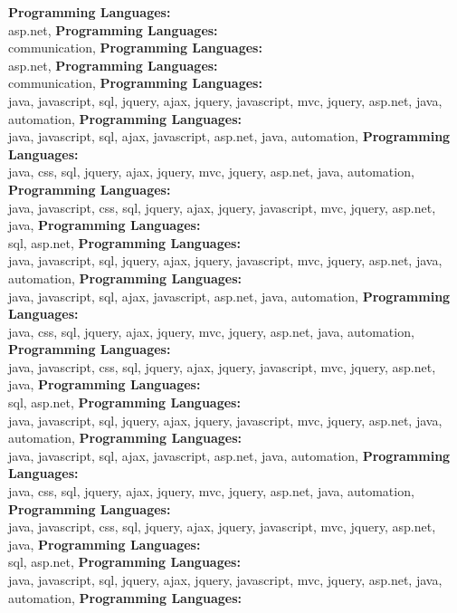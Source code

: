 \textbf{Programming Languages:} \\
asp.net, \textbf{Programming Languages:} \\
communication, \textbf{Programming Languages:} \\
asp.net, \textbf{Programming Languages:} \\
communication, \textbf{Programming Languages:} \\
java, javascript, sql, jquery, ajax,  jquery, javascript, mvc, jquery, asp.net, java, automation, \textbf{Programming Languages:} \\
java, javascript, sql, ajax, javascript, asp.net, java, automation, \textbf{Programming Languages:} \\
java, css, sql, jquery, ajax,  jquery, mvc, jquery, asp.net, java, automation, \textbf{Programming Languages:} \\
java, javascript, css, sql, jquery, ajax,  jquery, javascript, mvc, jquery, asp.net, java, \textbf{Programming Languages:} \\
sql, asp.net, \textbf{Programming Languages:} \\
java, javascript, sql, jquery, ajax,  jquery, javascript, mvc, jquery, asp.net, java, automation, \textbf{Programming Languages:} \\
java, javascript, sql, ajax, javascript, asp.net, java, automation, \textbf{Programming Languages:} \\
java, css, sql, jquery, ajax,  jquery, mvc, jquery, asp.net, java, automation, \textbf{Programming Languages:} \\
java, javascript, css, sql, jquery, ajax,  jquery, javascript, mvc, jquery, asp.net, java, \textbf{Programming Languages:} \\
sql, asp.net, \textbf{Programming Languages:} \\
java, javascript, sql, jquery, ajax,  jquery, javascript, mvc, jquery, asp.net, java, automation, \textbf{Programming Languages:} \\
java, javascript, sql, ajax, javascript, asp.net, java, automation, \textbf{Programming Languages:} \\
java, css, sql, jquery, ajax,  jquery, mvc, jquery, asp.net, java, automation, \textbf{Programming Languages:} \\
java, javascript, css, sql, jquery, ajax,  jquery, javascript, mvc, jquery, asp.net, java, \textbf{Programming Languages:} \\
sql, asp.net, \textbf{Programming Languages:} \\
java, javascript, sql, jquery, ajax,  jquery, javascript, mvc, jquery, asp.net, java, automation, \textbf{Programming Languages:} \\
